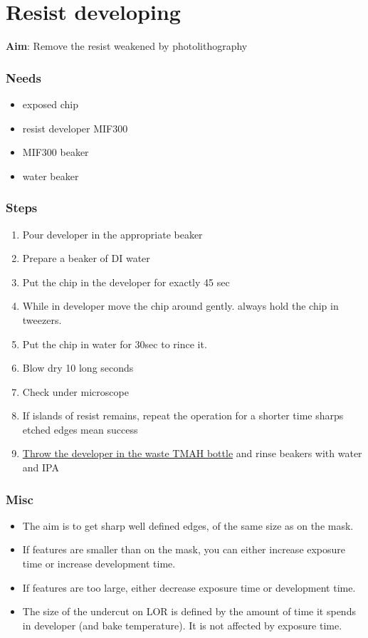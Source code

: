 \section{Resist developing}

\textbf{Aim}:
Remove the resist weakened by photolithography

\subsubsection{Needs}
\begin{itemize}[noitemsep]
\item exposed chip
\item resist developer MIF300
\item MIF300 beaker
\item water beaker
\end{itemize}

\subsubsection{Steps}
\begin{enumerate}
\item Pour developer in the appropriate beaker
\item Prepare a beaker of DI water
\item Put the chip in the developer for exactly 45 sec
\item While in developer move the chip around gently. always hold the chip in tweezers.
\item Put the chip in water for 30sec to rince it.
\item Blow dry 10 long seconds
\item Check under microscope
\item If islands of resist remains, repeat the operation for a shorter time
sharps etched edges mean success
\item \underline{Throw the developer in the waste TMAH bottle} and rinse beakers with water and IPA
\end{enumerate}

\subsubsection{Misc}
\begin{itemize}
  \item The aim is to get sharp well defined edges, of the same size as on the mask.
  \item If features are smaller than on the mask, you can either increase exposure time or increase development time.
  \item If features are too large, either decrease exposure time or development time.
  \item The size of the undercut on LOR is defined by the amount of time it spends in developer (and bake temperature).
  It is not affected by exposure time.
\end{itemize}
\newpage

